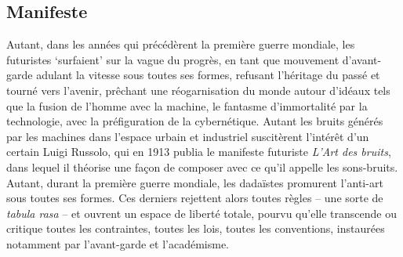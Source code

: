 \documentclass{article}
\begin{document}
\subsection{Manifeste}

Autant, dans les années qui précédèrent la première guerre mondiale, les futuristes `surfaient' sur la vague du progrès, en tant que mouvement d'avant-garde adulant la vitesse sous toutes ses formes, refusant l'héritage du passé et tourné vers l'avenir, prêchant une réogarnisation du monde autour d'idéaux tels que la fusion de l’homme avec la machine, le fantasme d'immortalité par la technologie, avec la préfiguration de la cybernétique. Autant les bruits générés par les machines dans l'espace urbain et industriel suscitèrent l'intérêt d'un certain Luigi Russolo, qui en 1913 publia le manifeste futuriste \textit{L'Art des bruits}, %
dans lequel il théorise une façon de composer avec ce qu'il appelle les sons-bruits. 
Autant, durant la première guerre mondiale, les dadaïstes promurent l'anti-art sous toutes ses formes. Ces derniers rejettent alors toutes règles -- une sorte de \textit{tabula rasa} -- et ouvrent un espace de liberté totale, pourvu qu'elle transcende ou critique toutes les contraintes, toutes les lois, toutes les conventions, instaurées notamment par l'avant-garde et l'académisme. 
\end{document}
